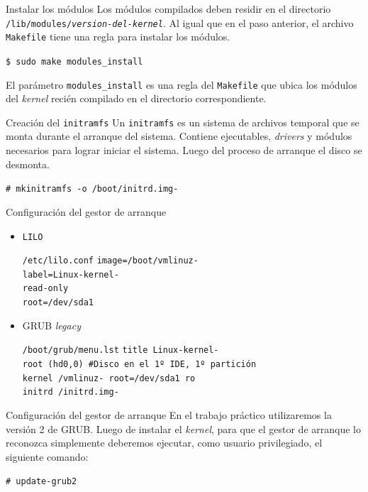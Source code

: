 \begin{frame}{Instalar los módulos}
  Los módulos compilados deben residir en el directorio
  \texttt{/lib/modules/\textit{version-del-kernel}}. Al igual que en el
  paso anterior, el archivo \texttt{Makefile} tiene una regla para instalar
  los módulos.
  \begin{block}{}
    \texttt{\$ sudo make modules\_install}
  \end{block}
  El parámetro \texttt{modules\_install} es una regla del \texttt{Makefile}
  que ubica los módulos del \textit{kernel} recién compilado en el
  directorio correspondiente.
\end{frame}

\begin{frame}{Creación del \texttt{initramfs}}
  Un \texttt{initramfs} es un sistema de archivos temporal que se monta
  durante el arranque del sistema. Contiene ejecutables, \textit{drivers} y
  módulos necesarios para lograr iniciar el sistema. Luego del proceso de
  arranque el disco se desmonta.
  
  \begin{block}{}
    \texttt{\# mkinitramfs -o /boot/initrd.img-\PATCHEDKERNELVERSION\ \PATCHEDKERNELVERSION }
  \end{block}  
\end{frame}

\begin{frame}{Configuración del gestor de arranque}
\begin{itemize}
\item \texttt{LILO}
  \begin{block}{\texttt{/etc/lilo.conf}}
    \texttt{image=/boot/vmlinuz-\PATCHEDKERNELVERSION \\
    label=Linux-kernel-\PATCHEDKERNELVERSION \\
    read-only \\
    root=/dev/sda1}
  \end{block}
\item GRUB \textit{legacy}
  \begin{block}{\texttt{/boot/grub/menu.lst}}
    \texttt{title     Linux-kernel-\PATCHEDKERNELVERSION \\
    root     (hd0,0) \#Disco en el 1º IDE, 1º partición \\
    kernel  /vmlinuz-\PATCHEDKERNELVERSION\ root=/dev/sda1 ro \\
    initrd /initrd.img-\PATCHEDKERNELVERSION}
  \end{block}
\end{itemize}
\end{frame}
\begin{frame}{Configuración del gestor de arranque}
  En el trabajo práctico utilizaremos la versión 2 de GRUB. Luego de
  instalar el \textit{kernel}, para que el gestor de arranque lo reconozca
  simplemente deberemos ejecutar, como usuario privilegiado, el siguiente
  comando:

  \begin{block}{}
    \texttt{\# update-grub2}
  \end{block}
  
\end{frame}

